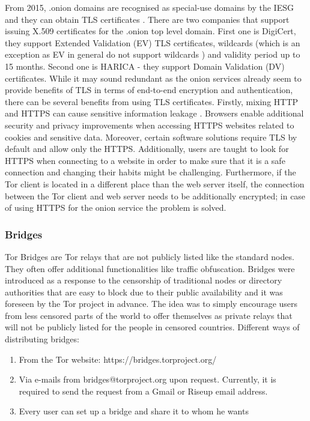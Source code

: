 From 2015, .onion domains are recognised as special-use domains by the IESG and they can obtain TLS certificates \cite{rfc-onion-domain}. There are two companies that support issuing X.509 certificates for the .onion top level domain. First one is DigiCert, they support Extended Validation (EV) TLS certificates,  wildcards (which is an exception as EV in general do not support wildcards \cite{digicert}) and validity period up to 15 months. Second one is HARICA - they support Domain Validation (DV) certificates. While it may sound redundant as the onion services already seem to provide benefits of TLS in terms of end-to-end encryption and authentication, there can be several benefits from using TLS certificates. Firstly, mixing HTTP and HTTPS can cause sensitive information leakage \cite{harica}. Browsers enable additional security and privacy improvements when accessing HTTPS websites related to cookies and sensitive data. Moreover, certain software solutions require TLS by default and allow only the HTTPS. Additionally, users are taught to look for HTTPS when connecting to a website in order to make sure that it is a safe connection and changing their habits might be challenging. Furthermore, if the Tor client is located in a different place than the web server itself, the connection between the Tor client and web server needs to be additionally encrypted; in case of using HTTPS for the onion service the problem is solved.

\subsubsection{Bridges}
Tor Bridges are Tor relays that are not publicly listed like the standard nodes. They often offer additional functionalities like traffic obfuscation. Bridges were introduced as a response to the censorship of traditional nodes or directory authorities that are easy to block due to their public availability and it was foreseen by the Tor project in advance. The idea was to simply encourage users from less censored parts of the world to offer themselves as private relays that will not be publicly listed for the people in censored countries.
Different ways of distributing bridges:
\begin{enumerate}
    \item From the Tor website: https://bridges.torproject.org/
    \item Via e-mails from bridges@torproject.org upon request. Currently, it is required to send the request from a Gmail or Riseup email address.
    \item Every user can set up a bridge and share it to whom he wants
\end{enumerate}

